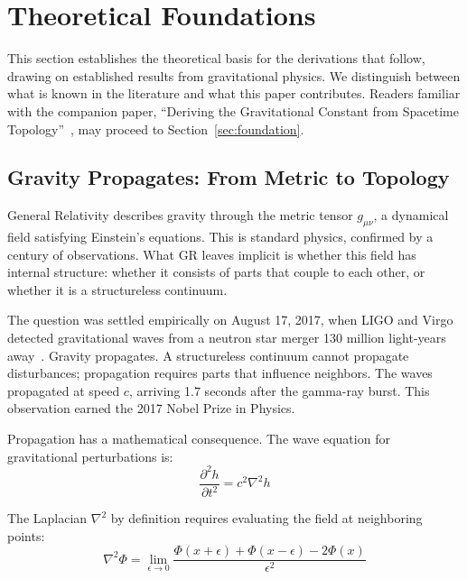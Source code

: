 \documentclass[aps,prd,preprint,superscriptaddress,showpacs,preprintnumbers,amsmath,amssymb,nofootinbib]{revtex4-2}
\begin{document}
\section{Theoretical Foundations}
\label{sec:theory}

This section establishes the theoretical basis for the derivations that follow, drawing on established results from gravitational physics. We distinguish between what is known in the literature and what this paper contributes. Readers familiar with the companion paper, ``Deriving the Gravitational Constant from Spacetime Topology''~\cite{paper6}, may proceed to Section~\ref{sec:foundation}.

\subsection{Gravity Propagates: From Metric to Topology}
\label{subsec:propagates}

General Relativity describes gravity through the metric tensor $g_{\mu\nu}$, a dynamical field satisfying Einstein's equations. This is standard physics, confirmed by a century of observations. What GR leaves implicit is whether this field has internal structure: whether it consists of parts that couple to each other, or whether it is a structureless continuum.

The question was settled empirically on August 17, 2017, when LIGO and Virgo detected gravitational waves from a neutron star merger 130 million light-years away~\cite{gw170817}. Gravity propagates. A structureless continuum cannot propagate disturbances; propagation requires parts that influence neighbors. The waves propagated at speed $c$, arriving 1.7 seconds after the gamma-ray burst. This observation earned the 2017 Nobel Prize in Physics.

Propagation has a mathematical consequence. The wave equation for gravitational perturbations is:
\begin{equation}
\frac{\partial^2 h}{\partial t^2} = c^2 \nabla^2 h
\end{equation}

The Laplacian $\nabla^2$ by definition requires evaluating the field at neighboring points:
\begin{equation}
\nabla^2 \Phi = \lim_{\epsilon \to 0} \frac{\Phi(x+\epsilon) + \Phi(x-\epsilon) - 2\Phi(x)}{\epsilon^2}
\end{equation}
\end{document}
